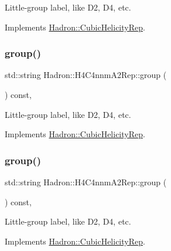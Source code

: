 Little-\/group label, like D2, D4, etc. 

Implements \mbox{\hyperlink{structHadron_1_1CubicHelicityRep_a101a7d76cd8ccdad0f272db44b766113}{Hadron\+::\+Cubic\+Helicity\+Rep}}.

\mbox{\label{structHadron_1_1H4C4nnmA2Rep_ae437f39da33de8e2ad9b152325fa7ce2}} 
\subsubsection{\texorpdfstring{group()}{group()}\hspace{0.1cm}{\footnotesize\ttfamily [3/5]}}
{\footnotesize\ttfamily std\+::string Hadron\+::\+H4\+C4nnm\+A2\+Rep\+::group (\begin{DoxyParamCaption}{ }\end{DoxyParamCaption}) const\hspace{0.3cm}{\ttfamily [inline]}, {\ttfamily [virtual]}}

Little-\/group label, like D2, D4, etc. 

Implements \mbox{\hyperlink{structHadron_1_1CubicHelicityRep_a101a7d76cd8ccdad0f272db44b766113}{Hadron\+::\+Cubic\+Helicity\+Rep}}.

\mbox{\label{structHadron_1_1H4C4nnmA2Rep_ae437f39da33de8e2ad9b152325fa7ce2}} 
\subsubsection{\texorpdfstring{group()}{group()}\hspace{0.1cm}{\footnotesize\ttfamily [4/5]}}
{\footnotesize\ttfamily std\+::string Hadron\+::\+H4\+C4nnm\+A2\+Rep\+::group (\begin{DoxyParamCaption}{ }\end{DoxyParamCaption}) const\hspace{0.3cm}{\ttfamily [inline]}, {\ttfamily [virtual]}}

Little-\/group label, like D2, D4, etc. 

Implements \mbox{\hyperlink{structHadron_1_1CubicHelicityRep_a101a7d76cd8ccdad0f272db44b766113}{Hadron\+::\+Cubic\+Helicity\+Rep}}.

